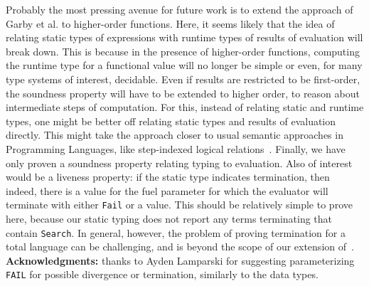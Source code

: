 \documentclass[acmsmall,screen,review]{acmart}
\begin{document}
Probably the most pressing avenue for future work is to extend the
approach of Garby et al. to higher-order functions.  Here, it seems
likely that the idea of relating static types of expressions with
runtime types of results of evaluation will break down.  This is
because in the presence of higher-order functions, computing the
runtime type for a functional value will no longer be simple or even,
for many type systems of interest, decidable.  Even if results are
restricted to be first-order, the soundness property will have to be
extended to higher order, to reason about intermediate steps of
computation.  For this, instead of relating static and runtime types,
one might be better off relating static types and results of
evaluation directly.  This might take the approach closer to usual
semantic approaches in Programming Languages, like step-indexed
logical relations~\cite{ahmed06}.  Finally, we have only proven a
soundness property relating typing to evaluation.  Also of interest
would be a liveness property: if the static type indicates
termination, then indeed, there is a value for the fuel parameter for
which the evaluator will terminate with either \verb|Fail| or a
value.  This should be relatively simple to prove here, because our
static typing does not report any terms terminating that contain
\verb|Search|.  In general, however, the problem of proving
termination for a total language can be challenging, and is beyond
the scope of our extension of~\citet{garby+25}.
\textbf{Acknowledgments:} thanks to Ayden Lamparski for suggesting
parameterizing \verb|FAIL| for possible divergence or termination, similarly
to the data types.



\end{document}
